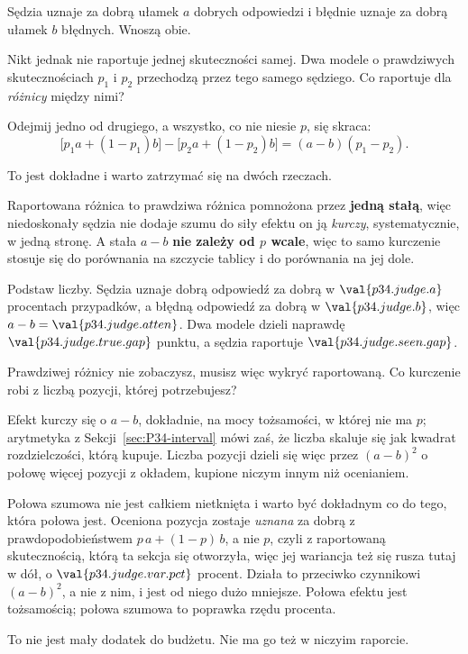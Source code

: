 \begin{fr}

Sędzia uznaje za dobrą ułamek $a$ dobrych odpowiedzi i błędnie uznaje za
dobrą ułamek $b$ błędnych. Wnoszą obie.

Nikt jednak nie raportuje jednej skuteczności samej. Dwa modele o prawdziwych
skutecznościach $p_{1}$ i $p_{2}$ przechodzą przez tego samego sędziego. Co
raportuje dla \emph{różnicy} między nimi?
\dotline
\nextframe
\end{fr}

\begin{fr}
\begin{ansblock}
Odejmij jedno od drugiego, a wszystko, co nie niesie $p$, się skraca:
\[ \bigl[p_{1}a + (1-p_{1})b\bigr] - \bigl[p_{2}a + (1-p_{2})b\bigr]
   = (a - b)(p_{1} - p_{2}) . \]
\end{ansblock}

To jest dokładne i warto zatrzymać się na dwóch rzeczach.

Raportowana różnica to prawdziwa różnica pomnożona przez \textbf{jedną
stałą}, więc niedoskonały sędzia nie dodaje szumu do siły efektu \dash{} on
ją \emph{kurczy}, systematycznie, w jedną stronę. A stała $a - b$ \textbf{nie
zależy od $p$ wcale}, więc to samo kurczenie stosuje się do porównania na
szczycie tablicy i do porównania na jej dole.
\end{fr}

\begin{fr}
Podstaw liczby. Sędzia uznaje dobrą odpowiedź za dobrą w
$\val{p34.judge.a}$ procentach przypadków, a błędną odpowiedź za dobrą w
$\val{p34.judge.b}$, więc $a - b = \val{p34.judge.atten}$. Dwa modele dzieli
naprawdę $\val{p34.judge.true.gap}$ punktu, a sędzia raportuje
$\val{p34.judge.seen.gap}$.

Prawdziwej różnicy nie zobaczysz, musisz więc wykryć raportowaną. Co kurczenie
robi z liczbą pozycji, której potrzebujesz?
\dotline
\nextframe
\end{fr}

\begin{fr}

Efekt kurczy się o $a - b$, dokładnie, na mocy tożsamości, w której nie ma
$p$; arytmetyka z Sekcji~\ref{sec:P34-interval} mówi zaś, że liczba skaluje
się jak kwadrat rozdzielczości, którą kupuje. Liczba pozycji dzieli się więc
przez $(a-b)^{2}$ \dash{} o połowę więcej pozycji z okładem, kupione niczym
innym niż ocenianiem.

Połowa szumowa nie jest całkiem nietknięta i warto być dokładnym co do tego,
która połowa jest. Oceniona pozycja zostaje \emph{uznana} za dobrą z
prawdopodobieństwem $p\,a + (1-p)\,b$, a nie $p$, czyli z raportowaną
skutecznością, którą ta sekcja się otworzyła, więc jej wariancja też się
rusza \dash{} tutaj w dół, o $\val{p34.judge.var.pct}$ procent. Działa to
przeciwko czynnikowi $(a-b)^{2}$, a nie z nim, i jest od niego dużo mniejsze.
Połowa efektu jest tożsamością; połowa szumowa to poprawka rzędu procenta.

To nie jest mały dodatek do budżetu. Nie ma go też w niczyim raporcie.
\end{fr}

